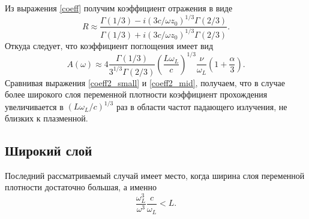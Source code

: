 \documentclass[12pt,a4paper]{article}
\numberwithin{equation}{section}
\begin{document}
{Из выражения \eqref{coeff} получим коэффициент отражения в виде
\begin{equation}
    \label{coeff1_mid}
    R \approx \frac{\Gamma\left(1/3\right) - i\left(3c/\omega z_0\right)^{1/3}\Gamma\left(2/3\right)}{\Gamma\left(1/3\right) + i\left(3c/\omega z_0\right)^{1/3}\Gamma\left(2/3\right)}.
\end{equation}
Откуда следует, что коэффициент поглощения имеет вид 
\begin{equation}
    \label{coeff2_mid}
    A\left(\omega\right) \approx 4 \frac{\Gamma\left(1/3\right)}{3^{1/3}\Gamma\left(2/3\right)}\left(\frac{L\omega_L}{c}\right)^{1/3}\frac{\nu}{\omega_L}\left(1+\frac{\alpha}{3}\right).
\end{equation}
Сравнивая выражения \eqref{coeff2_small} и \eqref{coeff2_mid}, получаем, что в случае более широкого слоя переменной плотности коэффициент прохождения увеличивается в $\left(L\omega_L/c\right)^{1/3}$ раз в области частот падающего излучения, не близких к плазменной.
\subsection{Широкий слой}
Последний рассматриваемый случай имеет место, когда ширина слоя переменной плотности достаточно большая, а именно
\begin{equation}
    \label{cond3}
    \frac{\omega_L^3}{\omega^3}\frac{c}{\omega_L}<L.
\end{equation}

}
\end{document}
